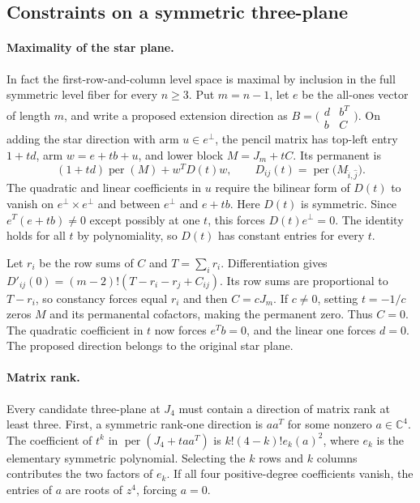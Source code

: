 \subsection{Constraints on a symmetric three-plane}
\label{sec:gct-three-plane}

\paragraph{Maximality of the star plane.}
In fact the first-row-and-column level space is maximal by inclusion in
the full symmetric level fiber for every \(n\ge3\). Put \(m=n-1\), let
\(e\) be the all-ones vector of length \(m\), and write a proposed
extension direction as \(B=\bigl(\begin{smallmatrix}d&b^T\\ b&C\end{smallmatrix}\bigr)\).
On adding the star direction with arm \(u\in e^\perp\), the pencil matrix
has top-left entry \(1+td\), arm \(w=e+tb+u\), and lower block
\(M=J_m+tC\). Its permanent is
\begin{equation*}
  (1+td)\operatorname{per}(M)+w^T D(t)w,
  \qquad D_{ij}(t)=\operatorname{per}\bigl(M_{\widehat i,\widehat j}\bigr).
\end{equation*}
The quadratic and linear coefficients in \(u\) require the bilinear
form of \(D(t)\) to vanish on \(e^\perp\times e^\perp\) and between
\(e^\perp\) and \(e+tb\). Here \(D(t)\) is symmetric. Since
\(e^T(e+tb)\ne0\) except possibly at one \(t\), this forces
\(D(t)e^\perp=0\). The identity holds for all \(t\) by polynomiality,
so \(D(t)\) has constant entries for every \(t\).

Let \(r_i\) be the row sums of \(C\) and \(T=\sum_i r_i\).
Differentiation gives
\(D'_{ij}(0)=(m-2)!(T-r_i-r_j+C_{ij})\).
Its row sums are proportional to \(T-r_i\), so constancy forces equal
\(r_i\) and then \(C=cJ_m\). If \(c\ne0\), setting \(t=-1/c\) zeros
\(M\) and its permanental cofactors, making the permanent zero. Thus
\(C=0\). The quadratic coefficient in \(t\) now forces \(e^Tb=0\), and
the linear one forces \(d=0\). The proposed direction belongs to the
original star plane.

\paragraph{Matrix rank.}
Every candidate three-plane at \(J_4\) must contain a direction of
matrix rank at least three. First, a symmetric rank-one direction is
\(aa^T\) for some nonzero \(a\in\mathbb C^4\). The coefficient of \(t^k\)
in \(\operatorname{per}(J_4+taa^T)\) is
\(k!(4-k)!e_k(a)^2\), where \(e_k\) is the elementary symmetric
polynomial. Selecting the \(k\) rows and \(k\) columns contributes
the two factors of \(e_k\). If all four positive-degree coefficients
vanish, the entries of \(a\) are roots of \(z^4\), forcing \(a=0\).

